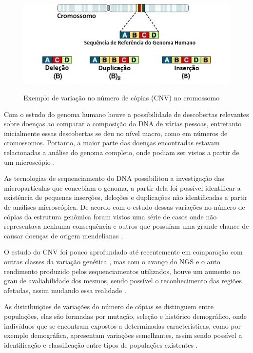 \begin{figure}[!htb]
    \centering
    \caption{Exemplo de variação no número de cópias (CNV) no cromossomo}
    \includegraphics[width=1\textwidth]{./dados/figuras/copy-number-variation}
    \label{fig:figura-copy-number-variation}
\end{figure}

Com o estudo do genoma humano \cite{Lander2001} houve a possibilidade de descobertas relevantes sobre doenças ao comparar a composição do DNA de várias pessoas, entretanto inicialmente essas descobertas se deu no nível macro, como em números de cromossomos. Portanto, a maior parte das doenças encontradas estavam relacionadas a análise do genoma completo, onde podiam ser vistos a partir de um microscópio \cite{Feuk2006}. 

As tecnologias de sequenciamento do DNA possibilitou a investigação das micropartículas que concebiam o genoma, a partir dela foi possível identificar a existência de pequenas inserções, deleções e duplicações não identificadas a partir de análises microscópica. De acordo com o estudo dessas variações no número de cópias da estrutura genômica foram vistos uma série de casos onde não representava nenhuma consequência e outros que possuíam uma grande chance de causar doenças de origem mendelianas \cite{Feuk2006,Xi2011}. 

O estudo do CNV foi pouco aprofundado até recentemente em comparação com outras classes da variação genética \cite{Redon2006}, mas com o avanço do NGS e o auto rendimento produzido pelos sequenciamentos utilizados, houve um aumento no grau de avaliabilidade dos mesmos, sendo possível o reconhecimento das regiões afetadas, assim mudando essa realidade \cite{Mills2011,Feuk2006}.

As distribuições de variações do número de cópias se distinguem entre populações, elas são formadas por mutação, seleção e histórico demográfico, onde indivíduos que se encontram expostos a determinadas características, como por exemplo demográfica, apresentam variações semelhantes, assim sendo possível a identificação e classificação entre tipos de populações existentes \cite{Redon2006}. 

